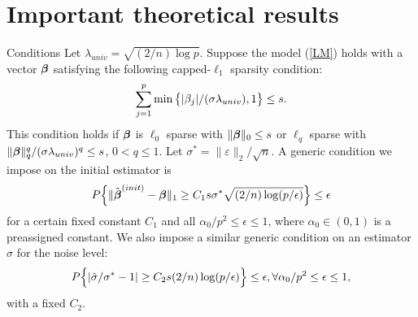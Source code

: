\section{Important theoretical results}
\begin{frame}

\sectionpage
\end{frame}

\begin{frame}
\begin{block}{Conditions}
\scriptsize
Let $\lambda_{univ}=\sqrt{(2/n)\log p}$. Suppose the model (\ref{LM}) holds with a vector $\mbox{\boldmath $\beta$}$ satisfying the following capped-$\ell_1$ sparsity condition:
\begin{equation}
\label{con19}
\setlength{\abovedisplayskip}{3pt} %
\setlength{\belowdisplayskip}{3pt}
\sum_{j=1}^p \min\big\{|\beta_j|/(\sigma \lambda_{univ}),1\big\} \leq s.
\end{equation}
This condition holds if $\mbox{\boldmath $\beta$}$ is $\ell_0$ sparse with $\|\mbox{\boldmath $\beta$}\|_0 \leq s$ or $\ell_q$ sparse with $\|\mbox{\boldmath $\beta$}\|_q^q/(\sigma\lambda_{univ})^q \leq s$, $0<q \leq 1$.
Let $\sigma^*=\|\varepsilon\|_2/\sqrt{n}$. A generic condition we impose on the initial estimator is
\begin{equation}
\label{con20}
\setlength{\abovedisplayskip}{3pt} %
\setlength{\belowdisplayskip}{3pt}
P\Big\{ \|\hat{\bbeta}^{(init)} - \bbeta\|_1 \geq C_1 s \sigma^*\sqrt{(2/n)\log(p/\epsilon)}\Big\} \leq \epsilon
\end{equation}
for a certain fixed constant $C_1$ and all $\alpha_0/p^2 \leq \epsilon \leq 1$,
where $\alpha_0\in (0,1)$ is a preassigned constant.
We also impose a similar generic condition on an estimator $\hat{\sigma}$ for the noise level:
\begin{equation}
\setlength{\abovedisplayskip}{3pt} %
\setlength{\belowdisplayskip}{3pt}
\label{con21}
P\Big\{ |\hat{\sigma}/\sigma^* - 1 | \geq C_2 s (2/n)\log(p/\epsilon) \Big\} \leq \epsilon, \forall \alpha_0/p^2 \leq \epsilon \leq 1,
\end{equation}
with a fixed $C_2$.
\end{block}
\end{frame}


